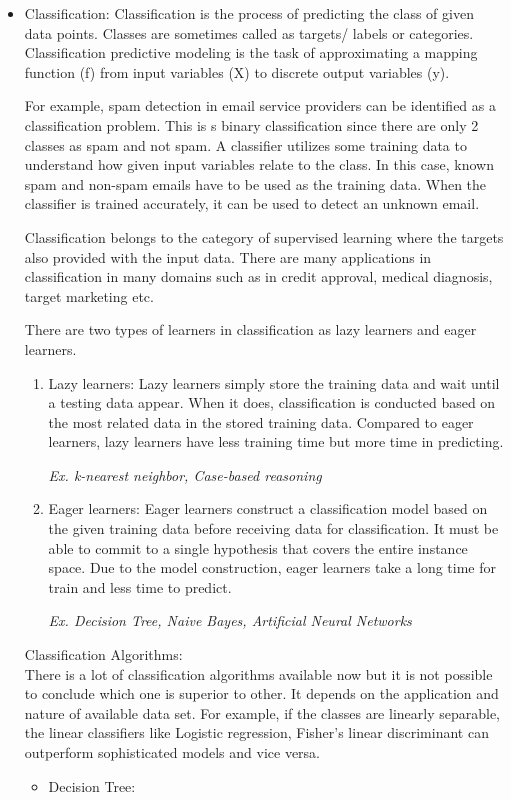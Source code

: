 \begin{itemize}
    \item Classification:
        Classification is the process of predicting the class of given data points. Classes are sometimes called as targets/ labels or categories. Classification predictive modeling is the task of approximating a mapping function (f) from input variables (X) to discrete output variables (y).

        For example, spam detection in email service providers can be identified as a classification problem. This is s binary classification since there are only 2 classes as spam and not spam. A classifier utilizes some training data to understand how given input variables relate to the class. In this case, known spam and non-spam emails have to be used as the training data. When the classifier is trained accurately, it can be used to detect an unknown email.

        Classification belongs to the category of supervised learning where the targets also provided with the input data. There are many applications in classification in many domains such as in credit approval, medical diagnosis, target marketing etc.

        There are two types of learners in classification as lazy learners and eager learners.
        \begin{enumerate}
            \item Lazy learners: Lazy learners simply store the training data and wait until a testing data appear. When it does, classification is conducted based on the most related data in the stored training data. Compared to eager learners, lazy learners have less training time but more time in predicting.

            \textit {Ex. k-nearest neighbor, Case-based reasoning}
    
            \item Eager learners: Eager learners construct a classification model based on the given training data before receiving data for classification. It must be able to commit to a single hypothesis that covers the entire instance space. Due to the model construction, eager learners take a long time for train and less time to predict.

            \textit{Ex. Decision Tree, Naive Bayes, Artificial Neural Networks}
    
        \end{enumerate}
        Classification Algorithms:\\
        There is a lot of classification algorithms available now but it is not possible to conclude which one is superior to other. It depends on the application and nature of available data set. For example, if the classes are linearly separable, the linear classifiers like Logistic regression, Fisher’s linear discriminant can outperform sophisticated models and vice versa.
        \begin{itemize}
            \item Decision Tree:
                

\end{itemize}
\end{itemize}
